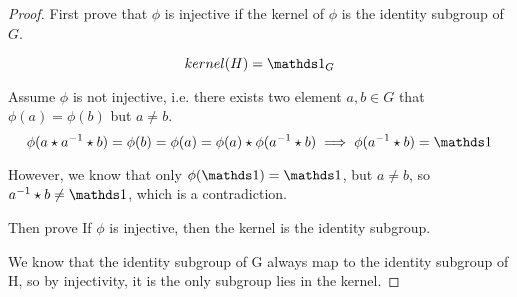 \begin{proof}
	First prove that $\phi$ is injective if the kernel of $\phi$ is the identity subgroup of $G$.

	$$
		kernel(H) = \one_G
	$$

	Assume $\phi$ is not injective, i.e. there exists two element $a,b \in G$ that $\phi(a) = \phi(b)$ but $a\neq b$.
	$$
		\phi(a \star a^{-1} \star b) = \phi(b) = \phi(a) = \phi(a) \star \phi(a^{-1} \star b) \implies \phi(a^{-1} \star b) = \one
	$$

	However, we know that only $\phi(\one) = \one$, but $a\neq b$, so $a^{-1} \star b \neq \one$, which is a contradiction.

	Then prove If $\phi$ is injective, then the kernel is the identity subgroup.

	We know that the identity subgroup of G always map to the identity subgroup of H,
	so by injectivity, it is the only subgroup lies in the kernel.


\end{proof}









